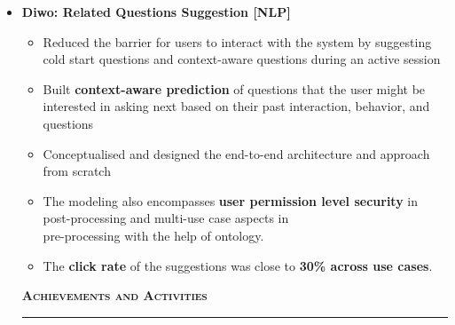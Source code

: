 \documentclass[a4paper,10pt]{article}
\newcommand{\isep}{-2 pt}
\newcommand{\lsep}{-0.5cm}
\newcommand{\resheading}[1]{{\small
        {
            \begin{minipage}
                {0.992\textwidth}\textbf{{\textsc{#1 \vphantom{p\^{E}} }}}
                \\[-0.3cm]
                \hrule
            \end{minipage}
            \\[-0.5cm]
        }
 }}
\begin{document}
\begin{itemize}
\item \textbf{Diwo: Related Questions Suggestion [NLP]} 
    \\[-0.6cm]
    \begin{itemize}\itemsep \isep
    	\item Reduced the barrier for users to interact with the system by suggesting cold start questions and context-aware questions during an active session 
        \item Built \textbf{context-aware prediction} of questions that the user might be interested in asking next based on their past interaction, behavior, and questions
        \item Conceptualised and designed the end-to-end architecture and approach from scratch 
        \item The modeling also encompasses \textbf{user permission level security} in post-processing and multi-use case aspects in \\ pre-processing with the help of ontology. 
        \item The \textbf{click rate} of the suggestions was close to \textbf{30\% across use cases}.
        \\ [-0.5cm]
    \end{itemize}




\vspace{4pt}
\noindent
\resheading{\textbf{\large Achievements and Activities}}\\[\lsep] 
\\[-0.2cm]
    \begin{itemize}
    

\end{itemize}
\end{itemize}
\end{document}
